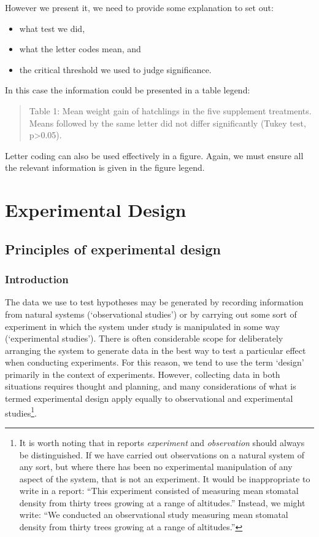 \documentclass[
]{book}
\providecommand{\tightlist}{%
  \setlength{\itemsep}{0pt}\setlength{\parskip}{0pt}}
\begin{document}
However we present it, we need to provide some explanation to set out:

\begin{itemize}
\tightlist
\item
  what test we did,
\item
  what the letter codes mean, and
\item
  the critical threshold we used to judge significance.
\end{itemize}

In this case the information could be presented in a table legend:

\begin{quote}
Table 1: Mean weight gain of hatchlings in the five supplement treatments. Means followed by the same letter did not differ significantly (Tukey test, p\textgreater0.05).
\end{quote}

Letter coding can also be used effectively in a figure. Again, we must ensure all the relevant information is given in the figure legend.

\hypertarget{part-experimental-design}{%
\part{Experimental Design}\label{part-experimental-design}}

\hypertarget{principles-experimental-design}{%
\chapter{Principles of experimental design}\label{principles-experimental-design}}

\hypertarget{introduction-4}{%
\section{Introduction}\label{introduction-4}}

The data we use to test hypotheses may be generated by recording information from natural systems (`observational studies') or by carrying out some sort of experiment in which the system under study is manipulated in some way (`experimental studies'). There is often considerable scope for deliberately arranging the system to generate data in the best way to test a particular effect when conducting experiments. For this reason, we tend to use the term `design' primarily in the context of experiments. However, collecting data in both situations requires thought and planning, and many considerations of what is termed experimental design apply equally to observational and experimental studies\footnote{It is worth noting that in reports \emph{experiment} and \emph{observation} should always be distinguished. If we have carried out observations on a natural system of any sort, but where there has been no experimental manipulation of any aspect of the system, that is not an experiment. It would be inappropriate to write in a report: ``This experiment consisted of measuring mean stomatal density from thirty trees growing at a range of altitudes.'' Instead, we might write: ``We conducted an observational study measuring mean stomatal density from thirty trees growing at a range of altitudes.''}.
\end{document}
